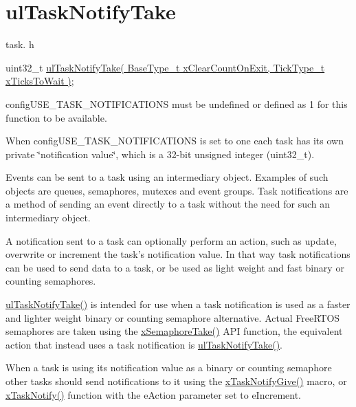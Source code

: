 \hypertarget{group__ulTaskNotifyTake}{\section{ul\-Task\-Notify\-Take}
\label{group__ulTaskNotifyTake}
}
task. h 
\begin{DoxyPre}uint32\_t \hyperlink{task_8h_a66540bef602522a01a519f776e4c07d8}{ulTaskNotifyTake( BaseType\_t xClearCountOnExit, TickType\_t xTicksToWait )};\end{DoxyPre}


config\-U\-S\-E\-\_\-\-T\-A\-S\-K\-\_\-\-N\-O\-T\-I\-F\-I\-C\-A\-T\-I\-O\-N\-S must be undefined or defined as 1 for this function to be available.

When config\-U\-S\-E\-\_\-\-T\-A\-S\-K\-\_\-\-N\-O\-T\-I\-F\-I\-C\-A\-T\-I\-O\-N\-S is set to one each task has its own private \char`\"{}notification value\char`\"{}, which is a 32-\/bit unsigned integer (uint32\-\_\-t).

Events can be sent to a task using an intermediary object. Examples of such objects are queues, semaphores, mutexes and event groups. Task notifications are a method of sending an event directly to a task without the need for such an intermediary object.

A notification sent to a task can optionally perform an action, such as update, overwrite or increment the task's notification value. In that way task notifications can be used to send data to a task, or be used as light weight and fast binary or counting semaphores.

\hyperlink{task_8h_a66540bef602522a01a519f776e4c07d8}{ul\-Task\-Notify\-Take()} is intended for use when a task notification is used as a faster and lighter weight binary or counting semaphore alternative. Actual Free\-R\-T\-O\-S semaphores are taken using the \hyperlink{semphr_8h_af116e436d2a5ae5bd72dbade2b5ea930}{x\-Semaphore\-Take()} A\-P\-I function, the equivalent action that instead uses a task notification is \hyperlink{task_8h_a66540bef602522a01a519f776e4c07d8}{ul\-Task\-Notify\-Take()}.

When a task is using its notification value as a binary or counting semaphore other tasks should send notifications to it using the \hyperlink{task_8h_ac60cbd05577a3e4f3c3587dd9b213930}{x\-Task\-Notify\-Give()} macro, or \hyperlink{task_8h_a0d2d54fb8a64011dfbb54983e4ed06bd}{x\-Task\-Notify()} function with the e\-Action parameter set to e\-Increment.


